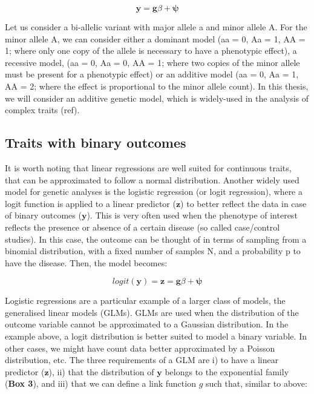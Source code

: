 \begin{equation}\label{eq12:Linear_regression_genetics}
 \mathbf{y} = \mathbf{g}\beta + \boldsymbol{\psi} 
\end{equation}

Let us consider a bi-allelic variant with major allele a and minor allele A. 
For the minor allele A, we can consider either a dominant model (aa = 0, Aa = 1, AA = 1; where only one copy of the allele is necessary to have a phenotypic effect), a recessive model, (aa = 0, Aa = 0, AA = 1; where two copies of the minor allele must be present for a phenotypic effect) or an additive model (aa = 0, Aa = 1, AA = 2; where the effect is proportional to the minor allele count). 
In this thesis, we will consider an additive genetic model, which is widely-used in the analysis of complex traits (ref).

\subsection{Traits with binary outcomes}

It is worth noting that linear regressions are well suited for continuous traits, that can be approximated to follow a normal distribution. 
Another widely used model for genetic analyses is the logistic regression (or logit regression), where a logit function is applied to a linear predictor ($\mathbf{z}$) to better reflect the data in case of binary outcomes ($\mathbf{y}$). 
This is very often used when the phenotype of interest reflects the presence or absence of a certain disease (so called case/control studies).
In this case, the outcome can be thought of in terms of sampling from a binomial distribution, with a fixed number of samples N, and a probability p to have the disease. Then, the model becomes:

\begin{equation}\label{eq13:Logistic_regression_genetics_z}
 logit(\mathbf{y}) = \mathbf{z} = \mathbf{g}\beta + \boldsymbol{\psi} 
\end{equation}

Logistic regressions are a particular example of a larger class of models, the generalised linear models (GLMs). 
GLMs are used when the distribution of the outcome variable cannot be approximated to a Gaussian distribution. 
In the example above, a logit distribution is better suited to model a binary variable. 
In other cases, we might have count data better approximated by a Poisson distribution, etc.
The three requirements of a GLM are i) to have a linear predictor ($\mathbf{z}$), ii) that the distribution of $\mathbf{y}$  belongs to the exponential family (\textbf{Box 3}), and iii) that we can define a link function $g$ such that, similar to above:

